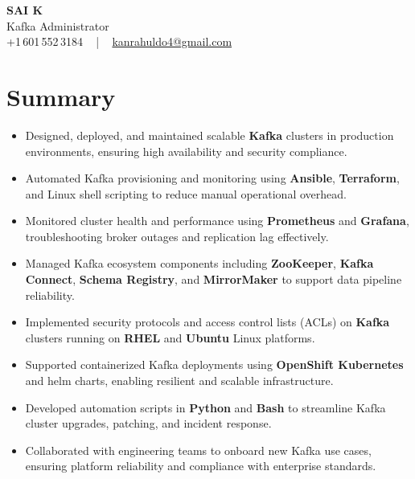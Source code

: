 \documentclass[letterpaper,11pt]{article}
\newcommand{\resumeItem}[1]{
  \item\footnotesize{
    {#1 \vspace{-2pt}}
  }
}
\newcommand{\resumeItemListStart}{\begin{itemize}[leftmargin=*]}
\newcommand{\resumeItemListEnd}{\end{itemize}\vspace{-5pt}}
\begin{document}
\begin{center}
    {\fontsize{14pt}{12pt}\selectfont \textbf{\MakeUppercase{Sai K}}}\\ \vspace{2pt}
    \fontsize{10pt}{12pt}\selectfont Kafka Administrator\\ \vspace{2pt}
    \fontsize{10pt}{12pt}\selectfont +1\,601\,552\,3184 ~ | ~
    \href{mailto:kanrahuldo4@gmail.com}{kanrahuldo4@gmail.com}
    \vspace{-10pt}
\end{center}

\section{Summary}
\fontsize{9pt}{10pt}\selectfont
\resumeItemListStart
  \resumeItem{Designed, deployed, and maintained scalable \textbf{Kafka} clusters in production environments, ensuring high availability and security compliance.}
  \resumeItem{Automated Kafka provisioning and monitoring using \textbf{Ansible}, \textbf{Terraform}, and Linux shell scripting to reduce manual operational overhead.}
  \resumeItem{Monitored cluster health and performance using \textbf{Prometheus} and \textbf{Grafana}, troubleshooting broker outages and replication lag effectively.}
  \resumeItem{Managed Kafka ecosystem components including \textbf{ZooKeeper}, \textbf{Kafka Connect}, \textbf{Schema Registry}, and \textbf{MirrorMaker} to support data pipeline reliability.}
  \resumeItem{Implemented security protocols and access control lists (ACLs) on \textbf{Kafka} clusters running on \textbf{RHEL} and \textbf{Ubuntu} Linux platforms.}
  \resumeItem{Supported containerized Kafka deployments using \textbf{OpenShift Kubernetes} and helm charts, enabling resilient and scalable infrastructure.}
  \resumeItem{Developed automation scripts in \textbf{Python} and \textbf{Bash} to streamline Kafka cluster upgrades, patching, and incident response.}
  \resumeItem{Collaborated with engineering teams to onboard new Kafka use cases, ensuring platform reliability and compliance with enterprise standards.}
\resumeItemListEnd
\vspace{-6pt}

\end{document}
